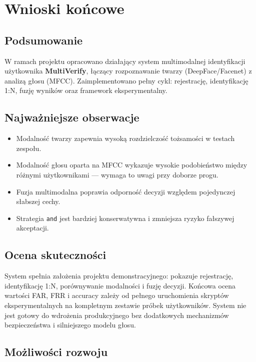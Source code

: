 \chapter{Wnioski końcowe}
\label{cha:wnioski}

\section{Podsumowanie}

W ramach projektu opracowano działający system multimodalnej identyfikacji użytkownika \textbf{MultiVerify}, łączący rozpoznawanie twarzy (DeepFace/Facenet) z analizą głosu (MFCC). Zaimplementowano pełny cykl: rejestrację, identyfikację 1:N, fuzję wyników oraz framework eksperymentalny.

\section{Najważniejsze obserwacje}

\begin{itemize}
    \item Modalność twarzy zapewnia wysoką rozdzielczość tożsamości w testach zespołu.
    \item Modalność głosu oparta na MFCC wykazuje wysokie podobieństwo między różnymi użytkownikami --- wymaga to uwagi przy doborze progu.
    \item Fuzja multimodalna poprawia odporność decyzji względem pojedynczej słabszej cechy.
    \item Strategia \texttt{and} jest bardziej konserwatywna i zmniejsza ryzyko fałszywej akceptacji.
\end{itemize}

\section{Ocena skuteczności}

System spełnia założenia projektu demonstracyjnego: pokazuje rejestrację, identyfikację 1:N, porównywanie modalności i fuzję decyzji. Końcowa ocena wartości FAR, FRR i accuracy zależy od pełnego uruchomienia skryptów eksperymentalnych na kompletnym zestawie próbek użytkowników. System nie jest gotowy do wdrożenia produkcyjnego bez dodatkowych mechanizmów bezpieczeństwa i silniejszego modelu głosu.

\section{Możliwości rozwoju}

